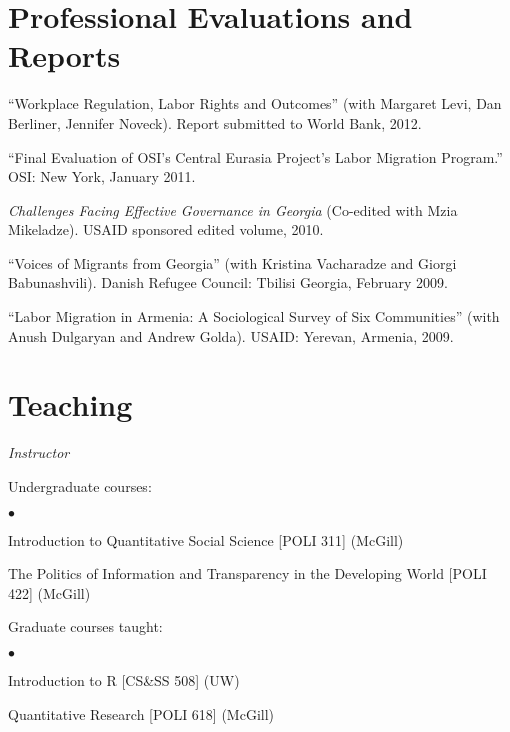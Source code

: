 \documentclass[margin,line]{res}
\newenvironment{list1}{
  \begin{list}{\ding{113}}{%
      \setlength{\itemsep}{0in}
      \setlength{\parsep}{0in} \setlength{\parskip}{0in}
      \setlength{\topsep}{0in} \setlength{\partopsep}{0in} 
      \setlength{\leftmargin}{0.17in}}}{\end{list}}
\newenvironment{list2}{
  \begin{list}{$\bullet$}{%
      \setlength{\itemsep}{0in}
      \setlength{\parsep}{0in} \setlength{\parskip}{0in}
      \setlength{\topsep}{0in} \setlength{\partopsep}{0in} 
      \setlength{\leftmargin}{0.2in}}}{\end{list}}
\begin{document}
{\begin{resume}
\section{\sc Professional Evaluations and Reports}

 ``Workplace Regulation, Labor Rights and Outcomes'' (with Margaret Levi, Dan Berliner, Jennifer Noveck). Report submitted to World Bank,  2012. 

``Final Evaluation of OSI's Central Eurasia Project's Labor Migration
Program.'' OSI: New York, January 2011. 

\emph{Challenges Facing Effective Governance in Georgia} (Co-edited with Mzia Mikeladze). USAID sponsored edited volume, 2010.  

``Voices of Migrants
from Georgia''  (with Kristina Vacharadze and Giorgi Babunashvili).
Danish Refugee Council: Tbilisi Georgia, February 2009.

``Labor Migration in Armenia:
A Sociological Survey of Six Communities'' (with Anush Dulgaryan and
Andrew Golda).  USAID: Yerevan, Armenia, 2009.


\section{\sc Teaching}
{\em Instructor}\\
\vspace{-.1in}
\begin{list1}

\item[] Undergraduate courses:
   \begin{list2}
   \item[] Introduction to Quantitative Social Science [POLI 311]
     (McGill)
   \item[] The Politics of Information and Transparency in the
     Developing World [POLI 422] (McGill)
\end{list2}

 \item[] Graduate courses taught:
   \begin{list2}
   \item[] Introduction to R  [CS\&SS 508] (UW)
   \item[] Quantitative Research [POLI 618] (McGill)
\end{list2}
\end{list1}


\end{resume}}
\end{document}
